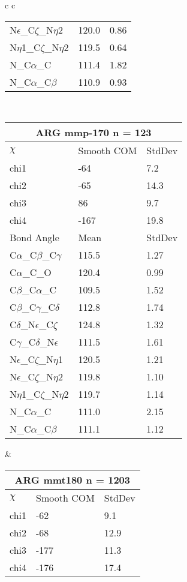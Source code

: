 \begin{longtable}{ c c }
\begin{tabular}{ l l l }
  N$\epsilon$\_C$\zeta$\_N$\eta$2 & 120.0 & 0.86\\
  N$\eta$1\_C$\zeta$\_N$\eta$2 & 119.5 & 0.64\\
  N\_C$\alpha$\_C & 111.4 & 1.82\\
  N\_C$\alpha$\_C$\beta$ & 110.9 & 0.93\\
  \bottomrule
  \end{tabular}
  \\
  \begin{tabular}{ l l l }
  \toprule
  \multicolumn{3}{c}{ARG \textbf{mmp-170} n = 123} \\ \toprule
  $\chi$       & Smooth COM & StdDev \\ \midrule
  chi1 & -64 & 7.2 \\ 
  chi2 & -65 & 14.3 \\ 
  chi3 & 86 & 9.7 \\ 
  chi4 & -167 & 19.8 \\ \midrule
  Bond Angle   & Mean     & StdDev \\ \midrule
  C$\alpha$\_C$\beta$\_C$\gamma$ & 115.5 & 1.27\\
  C$\alpha$\_C\_O & 120.4 & 0.99\\
  C$\beta$\_C$\alpha$\_C & 109.5 & 1.52\\
  C$\beta$\_C$\gamma$\_C$\delta$ & 112.8 & 1.74\\
  C$\delta$\_N$\epsilon$\_C$\zeta$ & 124.8 & 1.32\\
  C$\gamma$\_C$\delta$\_N$\epsilon$ & 111.5 & 1.61\\
  N$\epsilon$\_C$\zeta$\_N$\eta$1 & 120.5 & 1.21\\
  N$\epsilon$\_C$\zeta$\_N$\eta$2 & 119.8 & 1.10\\
  N$\eta$1\_C$\zeta$\_N$\eta$2 & 119.7 & 1.14\\
  N\_C$\alpha$\_C & 111.0 & 2.15\\
  N\_C$\alpha$\_C$\beta$ & 111.1 & 1.12\\
  \bottomrule
  \end{tabular}
  &
  \begin{tabular}{ l l l }
  \toprule
  \multicolumn{3}{c}{ARG \textbf{mmt180} n = 1203} \\ \toprule
  $\chi$       & Smooth COM & StdDev \\ \midrule
  chi1 & -62 & 9.1 \\ 
  chi2 & -68 & 12.9 \\ 
  chi3 & -177 & 11.3 \\ 
  chi4 & -176 & 17.4 \\ \midrule

\end{tabular}
\end{longtable}
